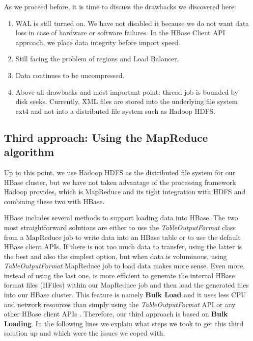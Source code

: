 
\bigskip

As we proceed before, it is time to discuss the drawbacks we discovered here:
\begin{enumerate}
\item WAL is still turned on. We have not disabled it because we do not want data loss in case of hardware or software failures. In the HBase Client API approach, we place data integrity before import speed.

\item Still facing the problem of regions and Load Balancer.

\item Data continues to be uncompressed.

\item Above all drawbacks and most important point: thread job is bounded by disk seeks. Currently, XML files are stored into the underlying file system ext4 and not into a distributed file system such as Hadoop HDFS.
\end{enumerate}


\subsection{Third approach: Using the MapReduce algorithm}


Up to this point, we use Hadoop HDFS as the distributed file system for our HBase cluster, but we have not taken advantage of the processing framework Hadoop provides, which is MapReduce and its tight integration with HDFS and combining these two with HBase.
\par
HBase includes several methods to support loading data into HBase. The two most straightforward solutions are either to use the \textit{TableOutputFormat} class from a MapReduce job to write data into an HBase table or to use the default HBase client APIs. If there is not too much data to transfer, using the latter is the best and also the simplest option, but when data is voluminous, using \textit{TableOutputFormat} MapReduce job to load data makes more sense. Even more, instead of using the last one, is more efficient to generate the internal HBase format files (HFiles) within our MapReduce job and then load the generated files into our HBase cluster. This feature is namely \textbf{Bulk Load} and it uses less CPU and network resources than simply using the \textit{TableOutputFormat} API or any other HBase client APIs \cite{ApacheHBaseBulkLoad}. Therefore, our third approach is based on \textbf{Bulk Loading}. In the following lines we explain what steps we took to get this third solution up and which were the issues we coped with.

